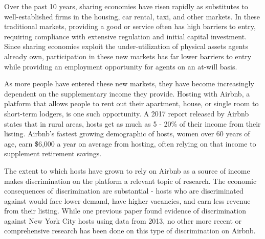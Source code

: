 \documentclass[11pt, oneside]{article}
\begin{document}
Over the past 10 years, sharing economies have risen rapidly as substitutes to well-established firms in the housing, car rental, taxi, and other markets. In these traditional markets, providing a good or service often has high barriers to entry, requiring compliance with extensive regulation and initial capital investment. Since sharing economies exploit the under-utilization of physical assets agents already own, participation in these new markets has far lower barriers to entry while providing an employment opportunity for agents on an at-will basis.\cite{sharing} 

As more people have entered these new markets, they have become increasingly dependent on the supplementary income they provide. Hosting with Airbnb, a platform that allows people to rent out their apartment, house, or single room to short-term lodgers, is one such opportunity. A 2017 report released by Airbnb states that in rural areas, hosts get as much as 5 - 20\% of their income from their listing.\cite{rural} Airbnb's fastest growing demographic of hosts, women over 60 years of age, earn \$6,000 a year on average from hosting, often relying on that income to supplement retirement savings.\cite{elderly}\cite{nyt2} 


The extent to which hosts have grown to rely on Airbnb as a source of income makes discrimination on the platform a relevant topic of research. The economic consequences of discrimination are substantial - hosts who are discriminated against would face lower demand, have higher vacancies, and earn less revenue from their listing. While one previous paper found evidence of discrimination against New York City hosts using data from 2013, no other more recent or comprehensive research has been done on this type of discrimination on Airbnb. 

\end{document}
